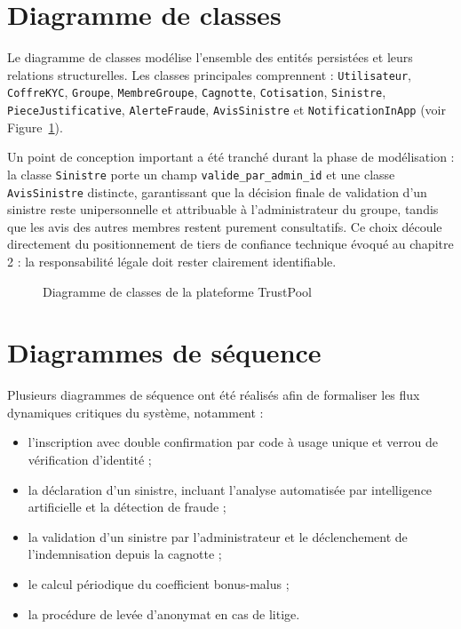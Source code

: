 \documentclass[12pt,a4paper]{report}
\begin{document}
\section{Diagramme de classes}
Le diagramme de classes modélise l'ensemble des entités persistées et leurs relations structurelles. Les classes principales comprennent : \texttt{Utilisateur}, \texttt{CoffreKYC}, \texttt{Groupe}, \texttt{MembreGroupe}, \texttt{Cagnotte}, \texttt{Cotisation}, \texttt{Sinistre}, \texttt{PieceJustificative}, \texttt{AlerteFraude}, \texttt{AvisSinistre} et \texttt{NotificationInApp} (voir Figure~\ref{fig:class-diagram}).

Un point de conception important a été tranché durant la phase de modélisation : la classe \texttt{Sinistre} porte un champ \texttt{valide\_par\_admin\_id} et une classe \texttt{AvisSinistre} distincte, garantissant que la décision finale de validation d'un sinistre reste unipersonnelle et attribuable à l'administrateur du groupe, tandis que les avis des autres membres restent purement consultatifs. Ce choix découle directement du positionnement de tiers de confiance technique évoqué au chapitre 2 : la responsabilité légale doit rester clairement identifiable.

\begin{figure}[H]
    \centering
    \caption{Diagramme de classes de la plateforme TrustPool}
    \label{fig:class-diagram}
\end{figure}

\section{Diagrammes de séquence}
Plusieurs diagrammes de séquence ont été réalisés afin de formaliser les flux dynamiques critiques du système, notamment :
\begin{itemize}
    \item l'inscription avec double confirmation par code à usage unique et verrou de vérification d'identité ;
    \item la déclaration d'un sinistre, incluant l'analyse automatisée par intelligence artificielle et la détection de fraude ;
    \item la validation d'un sinistre par l'administrateur et le déclenchement de l'indemnisation depuis la cagnotte ;
    \item le calcul périodique du coefficient bonus-malus ;
    \item la procédure de levée d'anonymat en cas de litige.
\end{itemize}
\end{document}
